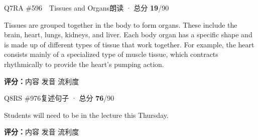 \begin{qblock}{Q7\quad RA \#596\ \ Tissues and Organs}{朗读 · 总分 \textcolor{cAccent}{\bfseries 19}/90}
\begin{promptbox}
Tissues are grouped together in the body to form organs. These include the brain, heart, lungs, kidneys, and liver. Each body organ has a specific shape and is made up of different types of tissue that work together. For example, the heart consists mainly of a specialized type of muscle tissue, which contracts rhythmically to provide the heart's pumping action.
\end{promptbox}
\asrlegend
\begin{asrbox}
       \pse {}                         \pse {}         \pse {}     \pse {}      \pse {}   \pse {}     
\end{asrbox}
\smallskip
{\small\textbf{评分：}内容  \quad\textperiodcentered\quad 发音  \quad\textperiodcentered\quad 流利度 }
\end{qblock}


\begin{qblock}{Q8\quad RS \#976}{复述句子 · 总分 \textcolor{cAccent}{\bfseries 76}/90}
\begin{promptbox}
Students will need to be in the lecture this Thursday.
\end{promptbox}
\asrlegend
\begin{asrbox}
         
\end{asrbox}
\smallskip
{\small\textbf{评分：}内容  \quad\textperiodcentered\quad 发音  \quad\textperiodcentered\quad 流利度 }
\end{qblock}

